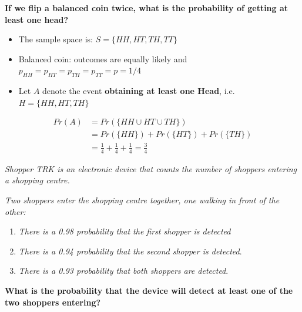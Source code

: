 \documentclass[notes=show,handout]{beamer}\usepackage[]{graphicx}\usepackage[]{color}
\begin{document}
\begin{frame}{\secname}
  \begin{example}
    \begin{footnotesize}
    \textbf{If we flip a balanced coin twice, {what is the probability of getting at least one head?}}

    \begin{itemize}
    \item The sample space is: $S = \{HH, HT, TH, TT\}$
    \item Balanced coin: outcomes are equally likely and $p_{HH} = p_{HT} = p_{TH} = p_{TT} = p = 1/4$
    \item Let $A$ denote the event \textbf{obtaining at least one Head}, i.e. $H = \{HH, HT, TH\}$
    \end{itemize}
    \begin{align*}
    Pr(A) &= Pr(\{HH \cup HT \cup TH\}) \\
          &= Pr(\{HH\}) +   Pr(\{HT\}) + Pr(\{TH\})\\
          &= \frac{1}{4} +\frac{1}{4}+\frac{1}{4} = \frac{3}{4}
    \end{align*}
    \end{footnotesize}
  \end{example}
\end{frame}

\begin{frame}{\secname}
  \begin{example}
      \begin{footnotesize}
      \textit{Shopper TRK is an electronic device that counts the number of shoppers entering a shopping centre.}

      \textit{Two shoppers enter the shopping centre together, one walking in front of the other:}

      \begin{enumerate}
      \item \textit{There is a 0.98 probability that the first shopper is detected}
      \item \textit{There is a 0.94 probability that the second shopper is detected}.
      \item \textit{There is a 0.93 probability that both shoppers are detected}.
      \end{enumerate}
      \textbf{What is the probability that the device will detect at least one of the two shoppers entering?}
    \end{footnotesize}
  \end{example}
\end{frame}
\end{document}
